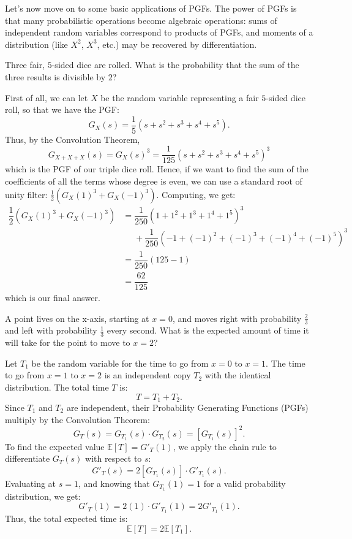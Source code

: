 \documentclass[11pt]{scrartcl}
\begin{document}
Let's now move on to some basic applications of PGFs. The power of PGFs is that many probabilistic operations become algebraic operations: sums of independent random variables correspond to products of PGFs, and moments of a distribution (like $X^2$, $X^3$, etc.) may be recovered by differentiation.

\begin{example*}
Three fair, $5$-sided dice are rolled. What is the probability that the sum of the three results is divisible by $2$?
\end{example*}

First of all, we can let $X$ be the random variable representing a fair $5$-sided dice roll, so that we have the PGF: \[G_X(s) = \dfrac{1}{5}\left(s+s^2+s^3+s^4+s^5\right).\] Thus, by the Convolution Theorem, \[G_{X+X+X}(s) = G_X(s)^3 = \dfrac{1}{125}\left(s+s^2+s^3+s^4+s^5\right)^3\] which is the PGF of our triple dice roll. Hence, if we want to find the sum of the coefficients of all the terms whose degree is even, we can use a standard root of unity filter: $\tfrac{1}{2}\left(G_X(1)^3+G_X(-1)^3\right)$. Computing, we get:
\begin{align*}
\dfrac{1}{2}\left(G_X(1)^3+G_X(-1)^3\right) &= \dfrac{1}{250}\left(1+1^2+1^3+1^4+1^5\right)^3 \\
&\phantom{=}+\dfrac{1}{250}\left(-1+(-1)^2+(-1)^3+(-1)^4+(-1)^5\right)^3 \\
&= \dfrac{1}{250}\left(125-1\right) \\
&= \boxed{\dfrac{62}{125}}
\end{align*}
which is our final answer.

\begin{example*}
A point lives on the x-axis, starting at $x = 0$, and moves right with probability $\tfrac{2}{3}$ and left with probability $\tfrac{1}{3}$ every second. What is the expected amount of time it will take for the point to move to $x = 2$?
\end{example*}

Let $T_1$ be the random variable for the time to go from $x = 0$ to $x = 1$. The time to go from $x = 1$ to $x = 2$ is an independent copy $T_2$ with the identical distribution. The total time $T$ is: \[T = T_1 + T_2.\] Since $T_1$ and $T_2$ are independent, their Probability Generating Functions (PGFs) multiply by the Convolution Theorem: \[G_T(s) = G_{T_1}(s) \cdot G_{T_2}(s) = [G_{T_1}(s)]^2.\] To find the expected value $\mathbb{E}[T] = G'_T(1)$, we apply the chain rule to differentiate $G_T(s)$ with respect to $s$: \[G'_T(s) = 2[G_{T_1}(s)] \cdot G'_{T_1}(s).\] Evaluating at $s = 1$, and knowing that $G_{T_1}(1) = 1$ for a valid probability distribution, we get: \[G'_T(1) = 2(1) \cdot G'_{T_1}(1) = 2G'_{T_1}(1).\] Thus, the total expected time is: \[\mathbb{E}[T] = 2\mathbb{E}[T_1].\]
\end{document}
